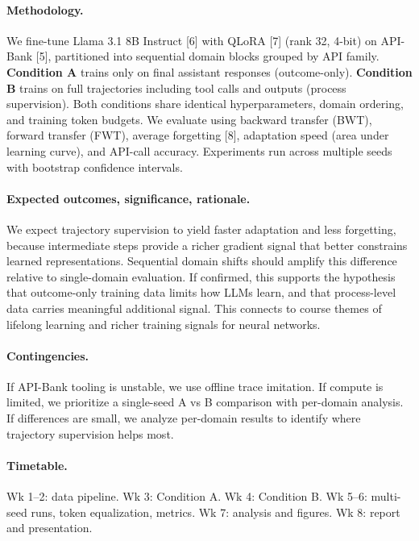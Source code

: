 \documentclass{article}
\begin{document}
\vspace{0.05cm}
\paragraph{Methodology.}
We fine-tune Llama 3.1 8B Instruct [6] with QLoRA [7] (rank 32, 4-bit) on API-Bank [5], partitioned into sequential domain blocks grouped by API family. \textbf{Condition A} trains only on final assistant responses (outcome-only). \textbf{Condition B} trains on full trajectories including tool calls and outputs (process supervision). Both conditions share identical hyperparameters, domain ordering, and training token budgets. We evaluate using backward transfer (BWT), forward transfer (FWT), average forgetting [8], adaptation speed (area under learning curve), and API-call accuracy. Experiments run across multiple seeds with bootstrap confidence intervals.

\paragraph{Expected outcomes, significance, rationale.}
We expect trajectory supervision to yield faster adaptation and less forgetting, because intermediate steps provide a richer gradient signal that better constrains learned representations. Sequential domain shifts should amplify this difference relative to single-domain evaluation. If confirmed, this supports the hypothesis that outcome-only training data limits how LLMs learn, and that process-level data carries meaningful additional signal. This connects to course themes of lifelong learning and richer training signals for neural networks.

\paragraph{Contingencies.}
If API-Bank tooling is unstable, we use offline trace imitation. If compute is limited, we prioritize a single-seed A vs B comparison with per-domain analysis. If differences are small, we analyze per-domain results to identify where trajectory supervision helps most.

\paragraph{Timetable.}
Wk 1--2: data pipeline. Wk 3: Condition A. Wk 4: Condition B. Wk 5--6: multi-seed runs, token equalization, metrics. Wk 7: analysis and figures. Wk 8: report and presentation.
\end{document}
